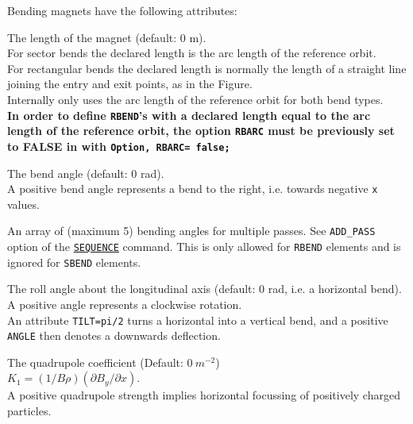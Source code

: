 Bending magnets have the following attributes:
\begin{madlist}
    The length of the magnet (default: 0 m). \\
   For sector bends the declared length is the arc length 
   of the reference orbit. \\
   For rectangular bends the declared length is normally the length of a
   straight line joining the entry and exit points, as in the
   Figure. \\ 
   Internally \madx only uses the arc length of the reference orbit for
   both bend types.\\ 
   {\bf In order to define {\tt RBEND}'s with a declared length equal to the
     arc length of the reference orbit, the option {\tt RBARC} must be
     previously set to FALSE in \madx with {\tt Option, RBARC= false;}} 
   
    The bend angle (default: 0 rad). \\ 
   A positive bend angle represents a bend to the right, i.e. towards
   negative {\tt x} values.  
   
    An array of (maximum 5) bending angles for
   multiple passes. See {\tt ADD\_PASS} option of the
   \href{sequence.html}{\tt SEQUENCE} command. This is only allowed for
   {\tt RBEND} elements and is ignored for {\tt SBEND} elements. 
 
    The roll angle about the longitudinal axis (default: 0
   rad, i.e. a horizontal bend). \\ 
   A positive angle represents a clockwise rotation. \\ 
   An attribute {\tt TILT=pi/2} turns a
   horizontal into a vertical bend, and a positive {\tt ANGLE} then denotes a
   downwards deflection.


    The quadrupole coefficient (Default: $0\ m^{-2}$)\\
     $K_1 = (1/B\rho) (\partial B_y / \partial x)$. \\
     A positive quadrupole strength implies horizontal focussing of
     positively charged particles.  


\end{madlist}
